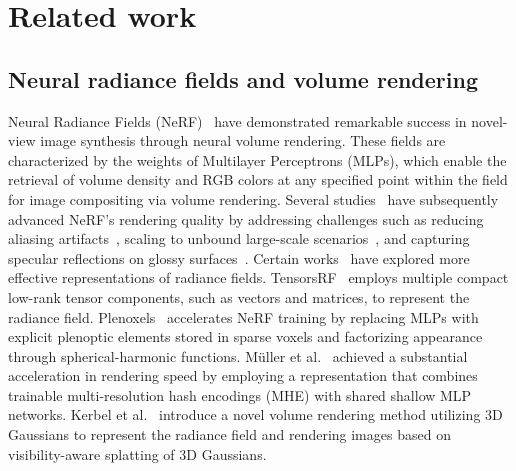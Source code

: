 \section{Related work}
\subsection{Neural radiance fields and volume rendering}


Neural Radiance Fields (NeRF)~\cite{mildenhall2020nerf} have demonstrated remarkable success in novel-view image synthesis through neural volume rendering. These fields are characterized by the weights of Multilayer Perceptrons (MLPs), which enable the retrieval of volume density and RGB colors at any specified point within the field for image compositing via volume rendering. Several studies~\cite{barron2021mip,barron2022mip,verbin2022ref,chen2022tensorf,fridovich2022plenoxels} have subsequently advanced NeRF's rendering quality by addressing challenges such as reducing aliasing artifacts~\cite{barron2021mip}, scaling to unbound large-scale scenarios~\cite{barron2022mip}, and capturing specular reflections on glossy surfaces~\cite{verbin2022ref}.
Certain works~\cite{chen2022tensorf,fridovich2022plenoxels,mueller2022instant,kerbl20233d} have explored more effective representations of radiance fields. TensorsRF~\cite{chen2022tensorf} employs multiple compact low-rank tensor components, such as vectors and matrices, to represent the radiance field. Plenoxels~\cite{fridovich2022plenoxels} accelerates NeRF training by replacing MLPs with explicit plenoptic elements stored in sparse voxels and factorizing appearance through spherical-harmonic functions.
M\"uller et al.~\cite{mueller2022instant} achieved a substantial acceleration in rendering speed by employing a representation that combines trainable multi-resolution hash encodings (MHE) with shared shallow MLP networks. Kerbel et al.~\cite{kerbl20233d} introduce a novel volume rendering method utilizing 3D Gaussians to represent the radiance field and rendering images based on visibility-aware splatting of 3D Gaussians.


